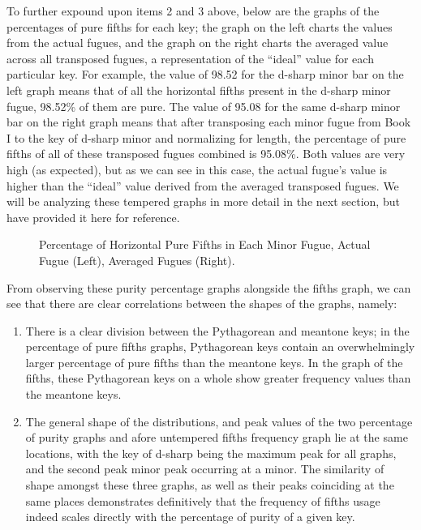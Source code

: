 To further expound upon items 2 and 3 above, below are the graphs of the
percentages of pure fifths for each key; the graph on the left charts
the values from the actual fugues, and the graph on the right charts the
averaged value across all transposed fugues, a representation of the
``ideal'' value for each particular key. For example, the value of 98.52
for the d-sharp minor bar on the left graph means that of all the
horizontal fifths present in the d-sharp minor fugue, 98.52\% of them
are pure. The value of 95.08 for the same d-sharp minor bar on the right
graph means that after transposing each minor fugue from Book I to the
key of d-sharp minor and normalizing for length, the percentage of pure
fifths of all of these transposed fugues combined is 95.08\%. Both
values are very high (as expected), but as we can see in this case, the
actual fugue's value is higher than the ``ideal'' value derived from the
averaged transposed fugues. We will be analyzing these tempered graphs
in more detail in the next section, but have provided it here for
reference.



\begin{figure}[H]
\vspace{1.5em}
    \centering
    \caption[Percentage of Horizontal Pure Fifths in Each Minor Fugue. ]{Percentage of Horizontal Pure Fifths in Each Minor Fugue, Actual Fugue (Left), Averaged Fugues (Right).}
\end{figure}    From observing these purity percentage graphs alongside the fifths
graph, we can see that there are clear correlations between the shapes
of the graphs, namely:

\begin{enumerate}
\def\labelenumi{\arabic{enumi}.}
\tightlist
\item
  There is a clear division between the Pythagorean and meantone keys;
  in the percentage of pure fifths graphs, Pythagorean keys contain an
  overwhelmingly larger percentage of pure fifths than the meantone
  keys. In the graph of the fifths, these Pythagorean keys on a whole
  show greater frequency values than the meantone keys.
\item
  The general shape of the distributions, and peak values of the two
  percentage of purity graphs and afore untempered fifths frequency
  graph lie at the same locations, with the key of d-sharp being the
  maximum peak for all graphs, and the second peak minor peak occurring
  at a minor. The similarity of shape amongst these three graphs, as
  well as their peaks coinciding at the same places demonstrates
  definitively that the frequency of fifths usage indeed scales directly
  with the percentage of purity of a given key.
\end{enumerate}

